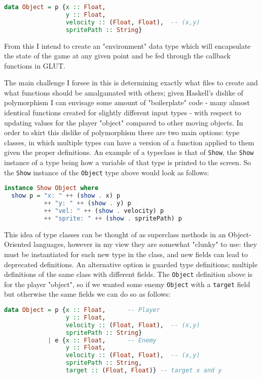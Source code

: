 \documentclass[12pt, a4paper]{report}
\begin{document}
\begin{lstlisting}[language=Haskell]
data Object = p {x :: Float,
                 y :: Float,
                 velocity :: (Float, Float),  -- (x,y)
                 spritePath :: String}
\end{lstlisting}

From this I intend to create an "environment" data type which will encapsulate the state of the game at any given point and be fed through the callback functions in GLUT.

\par

The main challenge I forsee in this is determining exactly what files to create and what functions should be amalgamated with others; given Haskell's dislike of polymorphism I can envisage some amount of "boilerplate" code - many almost identical functions created for slightly different input types - with respect to updating values for the player "object" compared to other moving objects.
In order to skirt this dislike of polymorphism there are two main options: type classes, in which multiple types can have a version of a function applied to them given the proper definitions.
An example of a typeclass is that of \verb|Show|, the \verb|Show| instance of a type being how a variable of that type is printed to the screen.
So the \verb|Show| instance of the \verb|Object| type above would look as follows:

\begin{lstlisting}[language=Haskell]
instance Show Object where
  show p = "x: " ++ (show . x) p
           ++ "y: " ++ (show . y) p
           ++ "vel: " ++ (show . velocity) p
           ++ "sprite: " ++ (show . spritePath) p
\end{lstlisting}

This idea of type classes can be thought of as superclass methods in an Object-Oriented languages, however in my view they are somewhat "clunky" to use: they must be instantiated for each new type in the class, and new fields can lead to deprecated definitions.
An alternative option is guarded type definitions; multiple definitions of the same class with different fields.
The \verb|Object| definition above is for the player "object", so if we wanted some enemy \verb|Object| with a \verb|target| field but otherwise the same fields we can do so as follows:

\begin{lstlisting}[language=Haskell]
data Object = p {x :: Float,      -- Player
                 y :: Float,
                 velocity :: (Float, Float),  -- (x,y)
                 spritePath :: String}
            | e {x :: Float,      -- Enemy
                 y :: Float,
                 velocity :: (Float, Float),  -- (x,y)
                 spritePath :: String,
                 target :: (Float, Float)} -- target x and y
\end{lstlisting}
\end{document}
